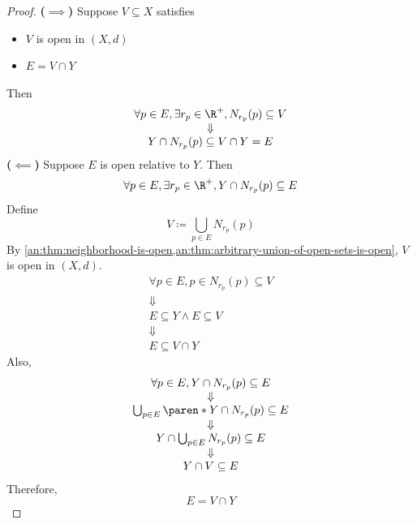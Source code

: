 \begin{proof}
  \textbf{($\implies$)} Suppose $V \subseteq X$ satisfies
  \begin{itemize}
    \item $V$ is open in $(X, d)$
    \item $E = V \cap Y$
  \end{itemize}
  Then
  \[
    \begin{array}{c}
      \forall p \in E, \exists r_{p} \in \R^{+}, N_{r_{p}}(p) \subseteq V \\
      \Downarrow                                                          \\
      Y \cap N_{r_{p}}(p) \subseteq V \cap Y = E
    \end{array}
  \]
  \textbf{($\impliedby$)} Suppose $E$ is open relative to $Y$. Then
  \[
    \forall p \in E, \exists r_{p} \in \R^{+}, Y \cap N_{r_{p}}(p) \subseteq E
  \]
  Define
  \[
    V \coloneqq \bigcup_{p \in E} N_{r_{p}}(p)
  \]
  By \cref{an:thm:neighborhood-is-open,an:thm:arbitrary-union-of-open-sets-is-open}, $V$ is open in $(X, d)$.
  \[
    \begin{array}{c}
      \forall p \in E, p \in N_{r_{p}}(p) \subseteq V \\
      \Downarrow                                      \\
      E \subseteq Y \land E \subseteq V               \\
      \Downarrow                                      \\
      E \subseteq V \cap Y
    \end{array}
  \]
  Also,
  \[
    \begin{array}{c}
      \forall p \in E, Y \cap N_{r_{p}}(p) \subseteq E           \\
      \Downarrow                                                 \\
      \bigcup_{p \in E} \paren*{Y \cap N_{r_{p}}(p)} \subseteq E \\
      \Downarrow                                                 \\
      Y \cap \bigcup_{p \in E} N_{r_{p}}(p) \subseteq E          \\
      \Downarrow                                                 \\
      Y \cap V \subseteq E
    \end{array}
  \]
  Therefore,
  \[
    E = V \cap Y
  \]
\end{proof}
